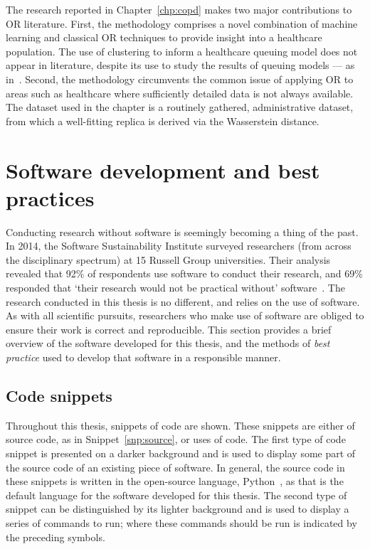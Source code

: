 The research reported in Chapter~\ref{chp:copd} makes two major contributions to
OR literature. First, the methodology comprises a novel combination of machine
learning and classical OR techniques to provide insight into a healthcare
population. The use of clustering to inform a healthcare queuing model does not
appear in literature, despite its use to study the results of queuing models ---
as in~\cite{Prokofyeva2020,Rebuge2012}. Second, the methodology circumvents the
common issue of applying OR to areas such as healthcare where sufficiently
detailed data is not always available. The dataset used in the chapter is a
routinely gathered, administrative dataset, from which a well-fitting replica is
derived via the Wasserstein distance.


\section{Software development and best practices}\label{sec:dev}

Conducting research without software is seemingly becoming a thing of the past.
In 2014, the Software Sustainability Institute surveyed researchers (from across
the disciplinary spectrum) at 15 Russell Group universities. Their analysis
revealed that 92\% of respondents use software to conduct their research, and
69\% responded that `their research would not be practical without'
software~\cite{Hettrick2014}. The research conducted in this thesis is no
different, and relies on the use of software. As with all scientific pursuits,
researchers who make use of software are obliged to ensure their work is correct
and reproducible. This section provides a brief overview of the software
developed for this thesis, and the methods of \emph{best practice} used to
develop that software in a responsible manner.

\subsection{Code snippets}

Throughout this thesis, snippets of code are shown. These snippets are either of
source code, as in Snippet~\ref{snp:source}, or uses of code. The first type of
code snippet is presented on a darker background and is used to display some
part of the source code of an existing piece of software. In general, the source
code in these snippets is written in the open-source language,
Python~\cite{python}, as that is the default language for the software developed
for this thesis. The second type of snippet can be distinguished by its lighter
background and is used to display a series of commands to run; where these
commands should be run is indicated by the preceding symbols.

